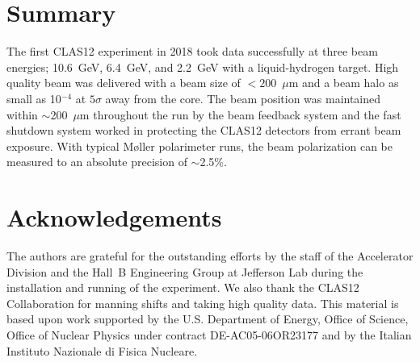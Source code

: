 \documentclass[final,3p,times,twocolumn]{elsarticle}
\begin{document}

\newpage










\section{Summary}

The first CLAS12 experiment in 2018 took data successfully at three beam energies; 10.6~GeV, 6.4~GeV, and
2.2~GeV with a liquid-hydrogen target. High quality beam was delivered with a beam size of $< 200$~$\mu$m
and a beam halo as small as 10$^{-4}$ at $5\sigma$ away from the core. The beam position was maintained within
$\sim$200~$\mu$m throughout the run  by the beam feedback system and the fast shutdown system worked in
protecting the CLAS12 detectors from errant beam exposure. With typical M{\o}ller polarimeter runs, the beam
polarization can be measured to an absolute precision of $\sim$2.5\%. 

\section{Acknowledgements}

The authors are grateful for the outstanding efforts by the staff of the Accelerator Division and the Hall~B
Engineering Group at Jefferson Lab during the installation and running of the experiment. We also thank the
CLAS12 Collaboration for manning shifts and taking high quality data. This material is based upon work supported
by the U.S. Department of Energy, Office of Science, Office of Nuclear Physics under contract
DE-AC05-06OR23177 and by the Italian Instituto Nazionale di Fisica Nucleare.





%


%


\end{document}
